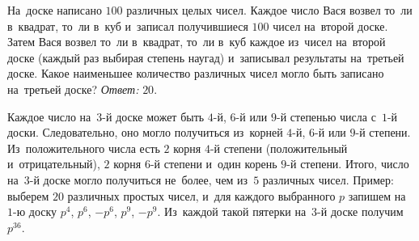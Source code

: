 \problem
На~доске написано $100$ различных целых чисел.
Каждое число Вася возвел то~ли в~квадрат, то~ли в~куб и~записал получившиеся
$100$ чисел на~второй доске.
Затем Вася возвел то~ли в~квадрат, то~ли в~куб каждое из~чисел на~второй доске
(каждый раз выбирая степень наугад) и~записывал результаты на~третьей доске.
Какое наименьшее количество различных чисел могло быть записано на~третьей
доске?
\solution
\emph{Ответ:} $20$.
\par
Каждое число на~$3$-й доске может быть $4$-й, $6$-й или $9$-й степенью числа
с~$1$-й доски.
Следовательно, оно могло получиться из~корней $4$-й, $6$-й или $9$-й степени.
Из~положительного числа есть $2$ корня $4$-й степени
(положительный и~отрицательный), $2$ корня $6$-й степени и~один корень $9$-й
степени.
Итого, число на~$3$-й доске могло получиться не~более, чем из~$5$ различных
чисел.
Пример: выберем $20$ различных простых чисел, и~для каждого выбранного $p$
запишем на~$1$-ю доску $p^4$,  $p^6$, $-p^6$, $p^9$, $-p^9$.
Из~каждой такой пятерки на~$3$-й доске получим $p^{36}$.
\endproblem
